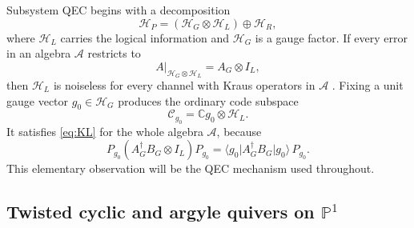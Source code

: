 \documentclass[11pt]{article}
\theoremstyle{definition}
\theoremstyle{remark}
\newcommand{\C}{\mathbb C}
\newcommand{\Pp}{\mathbb P}
\newcommand{\cH}{\mathcal H}
\newcommand{\cA}{\mathcal A}
\newcommand{\cC}{\mathcal C}
\newcommand{\ket}[1]{\lvert #1\rangle}
\newcommand{\bra}[1]{\langle #1\rvert}
\begin{document}
Subsystem QEC begins with a decomposition
\begin{equation}\label{eq:subsystem-decomposition}
 \cH_P=(\cH_G\otimes\cH_L)\oplus\cH_R,
\end{equation}
where $\cH_L$ carries the logical information and $\cH_G$ is a gauge factor.  If every error in an algebra $\cA$ restricts to
\begin{equation}\label{eq:gauge-algebra}
  A\big|_{\cH_G\otimes\cH_L}=A_G\otimes I_L,
\end{equation}
then $\cH_L$ is noiseless for every channel with Kraus operators in $\cA$ \cite{KribsLaflammePoulinLesosky2006}.  Fixing a unit gauge vector $g_0\in\cH_G$ produces the ordinary code subspace
\begin{equation}\label{eq:gauge-fixed-code}
  \cC_{g_0}=\C g_0\otimes\cH_L.
\end{equation}
It satisfies \eqref{eq:KL} for the whole algebra $\cA$, because
\begin{equation}\label{eq:gauge-fixed-KL}
 P_{g_0}(A_G^\dagger B_G\otimes I_L)P_{g_0}
 =\bra{g_0}A_G^\dagger B_G\ket{g_0}\,P_{g_0}.
\end{equation}
This elementary observation will be the QEC mechanism used throughout.

\subsection{Twisted cyclic and argyle quivers on \texorpdfstring{$\Pp^1$}{the projective line}}
\end{document}
